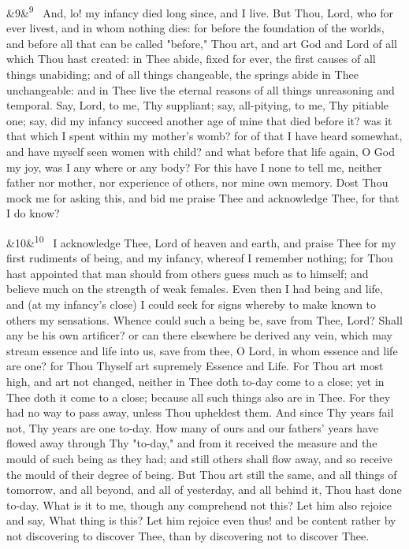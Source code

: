 \documentclass[12pt]{article}
\newcommand{\para}[1][]{\par\noindent\ifx&#1&\else\textsuperscript{\footnotesize #1}~\fi}
\begin{document}
\para[9] And, lo! my infancy died long since, and I live. But Thou, Lord, who for ever livest, and in whom nothing dies: for before the foundation of the worlds, and before all that can be called "before," Thou art, and art God and Lord of all which Thou hast created: in Thee abide, fixed for ever, the first causes of all things unabiding; and of all things changeable, the springs abide in Thee unchangeable: and in Thee live the eternal reasons of all things unreasoning and temporal. Say, Lord, to me, Thy suppliant; say, all-pitying, to me, Thy pitiable one; say, did my infancy succeed another age of mine that died before it? was it that which I spent within my mother's womb? for of that I have heard somewhat, and have myself seen women with child? and what before that life again, O God my joy, was I any where or any body? For this have I none to tell me, neither father nor mother, nor experience of others, nor mine own memory. Dost Thou mock me for asking this, and bid me praise Thee and acknowledge Thee, for that I do know?

\para[10] I acknowledge Thee, Lord of heaven and earth, and praise Thee for my first rudiments of being, and my infancy, whereof I remember nothing; for Thou hast appointed that man should from others guess much as to himself; and believe much on the strength of weak females. Even then I had being and life, and (at my infancy's close) I could seek for signs whereby to make known to others my sensations. Whence could such a being be, save from Thee, Lord? Shall any be his own artificer? or can there elsewhere be derived any vein, which may stream essence and life into us, save from thee, O Lord, in whom essence and life are one? for Thou Thyself art supremely Essence and Life. For Thou art most high, and art not changed, neither in Thee doth to-day come to a close; yet in Thee doth it come to a close; because all such things also are in Thee. For they had no way to pass away, unless Thou upheldest them. And since Thy years fail not, Thy years are one to-day. How many of ours and our fathers' years have flowed away through Thy "to-day," and from it received the measure and the mould of such being as they had; and still others shall flow away, and so receive the mould of their degree of being. But Thou art still the same, and all things of tomorrow, and all beyond, and all of yesterday, and all behind it, Thou hast done to-day. What is it to me, though any comprehend not this? Let him also rejoice and say, What thing is this? Let him rejoice even thus! and be content rather by not discovering to discover Thee, than by discovering not to discover Thee.
\end{document}

